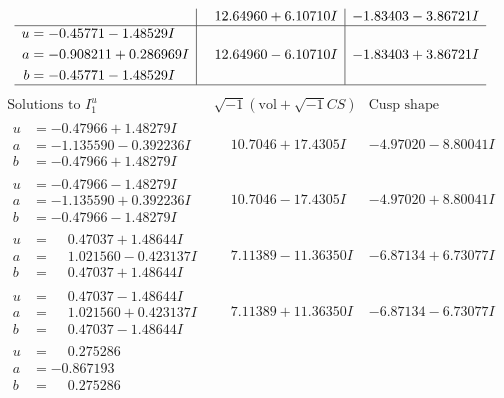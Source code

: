 \documentclass[1p]{elsarticle_modified}
\theoremstyle{definition}
\newcommand{\I}{\sqrt{-1}}
\begin{document}
$$\begin{array}{c|c|c}
 & \phantom{-}12.64960 + 6.10710 I & -1.83403 - 3.86721 I \\ \hline\begin{aligned}
u &= -0.45771 - 1.48529 I \\
a &= -0.908211 + 0.286969 I \\
b &= -0.45771 - 1.48529 I\end{aligned}
 & \phantom{-}12.64960 - 6.10710 I & -1.83403 + 3.86721 I\\
 \hline 
 \end{array}$$\newpage$$\begin{array}{c|c|c}  
\text{Solutions to }I^u_{1}& \I (\text{vol} + \sqrt{-1}CS) & \text{Cusp shape}\\
 \hline 
\begin{aligned}
u &= -0.47966 + 1.48279 I \\
a &= -1.135590 - 0.392236 I \\
b &= -0.47966 + 1.48279 I\end{aligned}
 & \phantom{-}10.7046 + 17.4305 I & -4.97020 - 8.80041 I \\ \hline\begin{aligned}
u &= -0.47966 - 1.48279 I \\
a &= -1.135590 + 0.392236 I \\
b &= -0.47966 - 1.48279 I\end{aligned}
 & \phantom{-}10.7046 - 17.4305 I & -4.97020 + 8.80041 I \\ \hline\begin{aligned}
u &= \phantom{-}0.47037 + 1.48644 I \\
a &= \phantom{-}1.021560 - 0.423137 I \\
b &= \phantom{-}0.47037 + 1.48644 I\end{aligned}
 & \phantom{-}7.11389 - 11.36350 I & -6.87134 + 6.73077 I \\ \hline\begin{aligned}
u &= \phantom{-}0.47037 - 1.48644 I \\
a &= \phantom{-}1.021560 + 0.423137 I \\
b &= \phantom{-}0.47037 - 1.48644 I\end{aligned}
 & \phantom{-}7.11389 + 11.36350 I & -6.87134 - 6.73077 I \\ \hline\begin{aligned}
u &= \phantom{-}0.275286\phantom{ +0.000000I} \\
a &= -0.867193\phantom{ +0.000000I} \\
b &= \phantom{-}0.275286\phantom{ +0.000000I}\end{aligned}

\end{array}$$
\end{document}
